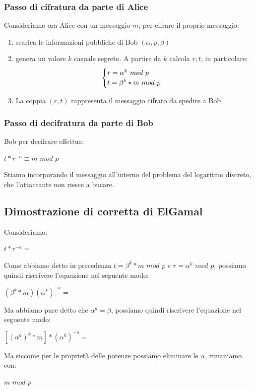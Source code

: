\documentclass[11pt, oneside]{article}   	%
\begin{document}
\subsubsection*{Passo di cifratura da parte di Alice}
Consideriamo ora Alice con un messaggio $m$, per cifrare il proprio messaggio: 
\begin{enumerate}
\item scarica le informazioni pubbliche di Bob $(\alpha, p, \beta)$ 
\item genera un valore $k$ casuale segreto. A partire da $k$ calcola $r,t$, in particolare:
\begin{equation}
    \begin{cases}
r = \alpha^k$ $mod$ $p\\
t = \beta^k  * m$ $mod$ $p
\end{cases}
\end{equation}
\item La coppia $(r,t)$ rappresenta il messaggio cifrato da spedire a Bob
\end{enumerate}

\subsubsection*{Passo di decifratura da parte di Bob}
Bob per decifrare effettua:
\begin{center}
$t * r^{-a} \equiv m$ $mod$ $p$
\end{center}
Stiamo incorporando il messaggio all'interno del problema del logaritmo discreto, che l'attaccante non riesce a bucare.
\subsection*{Dimostrazione di corretta di ElGamal}
Consideriamo: \begin{center}
$t * r^{-a} =$ 
\end{center}
Come abbiamo detto in precedenza $t = \beta^k  * m$ $mod$ $p$ e $r = \alpha^k$ $mod$ $p$, possiamo quindi riscrivere l'equazione nel seguente modo: \begin{center}
$(\beta^k * m)(\alpha^k)^{-a}=$
\end{center}
Ma abbiamo pure detto che $\alpha^a = \beta$, possiamo quindi riscrivere l'equazione nel seguente modo:
\begin{center}
$[(\alpha^a)^k*m]*(\alpha^k)^{-a} = $
\end{center}
Ma siccome per le proprietà delle potenze possiamo eliminare le $\alpha$, rimaniamo con:
\begin{center}
$m$ $mod$ $p$
\end{center}
\end{document}
